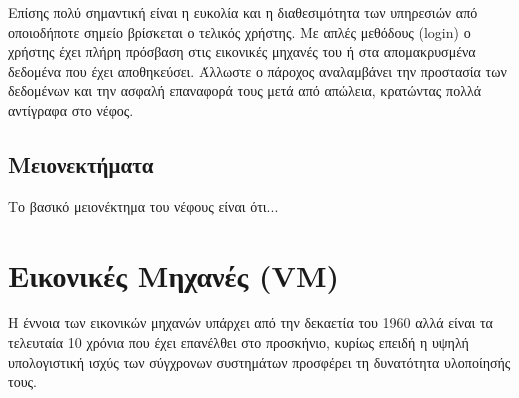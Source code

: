 Επίσης πολύ σημαντική είναι η ευκολία και η διαθεσιμότητα των υπηρεσιών από
οποιοδήποτε σημείο βρίσκεται ο τελικός χρήστης. Με απλές μεθόδους (login) ο
χρήστης έχει πλήρη πρόσβαση στις εικονικές μηχανές του ή στα απομακρυσμένα
δεδομένα που έχει αποθηκεύσει. Άλλωστε ο πάροχος αναλαμβάνει την προστασία των
δεδομένων και την ασφαλή επαναφορά τους μετά από απώλεια, κρατώντας πολλά αντίγραφα
στο νέφος.

\subsection{Μειονεκτήματα}
Το βασικό μειονέκτημα του νέφους είναι ότι...

\section{Εικονικές Μηχανές (VM)}
Η έννοια των εικονικών μηχανών υπάρχει από την δεκαετία του 1960 αλλά είναι τα
τελευταία 10 χρόνια που έχει επανέλθει στο προσκήνιο, κυρίως επειδή η υψηλή
υπολογιστική ισχύς των σύγχρονων συστημάτων προσφέρει τη δυνατότητα υλοποίησής
τους.
